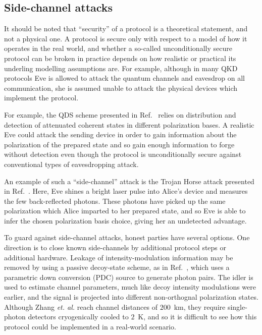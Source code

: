 \subsection{Side-channel attacks}
It should be noted that ``security'' of a protocol is a theoretical statement, and not a physical one. A protocol is secure only with respect to a model of how it operates in the real world, and whether a so-called unconditionally secure protocol can be broken in practice depends on how realistic or practical its underling modelling assumptions are. For example, although in many QKD protocols Eve is allowed to attack the quantum channels and eavesdrop on all communication, she is assumed unable to attack the physical devices which implement the protocol. 

For example, the QDS scheme presented in Ref.~\cite{Amiri2016} relies on distribution and detection of attenuated coherent states in different polarization bases. A realistic Eve could attack the sending device in order to gain information about the polarization of the prepared state and so gain enough information to forge without detection even though the protocol is unconditionally secure against conventional types of eavesdropping attack.

An example of such a ``side-channel'' attack is the Trojan Horse attack presented in Ref.~\cite{Jain2014}. Here, Eve shines a bright laser pulse into Alice's device and measures the few back-reflected photons. These photons have picked up the same polarization which Alice imparted to her prepared state, and so Eve is able to infer the chosen polarization basis choice, giving her an undetected advantage. %

To guard against side-channel attacks, honest parties have several options. One direction is to close known side-channels by additional protocol steps or additional hardware. Leakage of intensity-modulation information may be removed by using a passive decoy-state scheme, as in Ref.~\cite{Zhang2018b}, which uses a parametric down conversion (PDC) source to generate photon pairs. The idler is used to estimate channel parameters, much like decoy intensity modulations were earlier, and the signal is projected into different non-orthognal polarization states. Although Zhang \emph{et. al.} reach channel distances of $200$~km, they require single-photon detectors cryogenically cooled to $2$~K, and so it is difficult to see how this protocol could be implemented in a real-world scenario.


